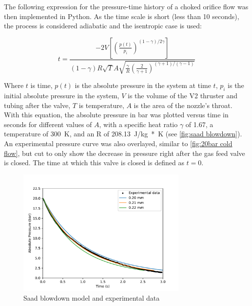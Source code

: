             The following expression for the pressure-time history  of a choked orifice flow \cite{saadCompressibleFluidFlow} was then implemented in Python. As the time scale is short (less than 10 seconds), the process is considered adiabatic and the isentropic case is used:

            \begin{equation}
                t =  \frac{-2V \left[\left(\frac{p(t)}{p_i}\right)^{(1-\gamma) / 2\gamma}\right]}{(1-\gamma) R \sqrt{T} A \sqrt{\frac{\gamma}{R}(\frac{2}{\gamma + 1})^{(\gamma+1) / (\gamma-1)}}}
            \end{equation}

            Where $t$ is time, $p(t)$ is the absolute pressure in the system at time $t$, $p_i$ is the initial absolute pressure in the system, $V$ is the volume of the V2 thruster and tubing after the valve, $T$ is temperature, $A$ is the area of the nozzle's throat.  With this equation, the absolute pressure in bar was plotted versus time in seconds for different values of $A$, with a specific heat ratio $\gamma$ of 1.67, a temperature of \qty{300}{K}, and an R of \qty{208.13}{J/kg*K} (see \autoref{fig:saad blowdown}). An experimental pressure curve was also overlayed, similar to \autoref{fig:20bar cold flow}, but cut to only show the decrease in pressure right after the gas feed valve is closed. The time at which this valve is closed is defined as $t=0$.

            \begin{figure}[!ht]
                \centering
                \includegraphics[width=0.75\textwidth]{assets/4 experiments/Saad blowdown fit.pdf}
                \caption{Saad blowdown model and experimental data}
                \label{fig:saad blowdown}
            \end{figure}

